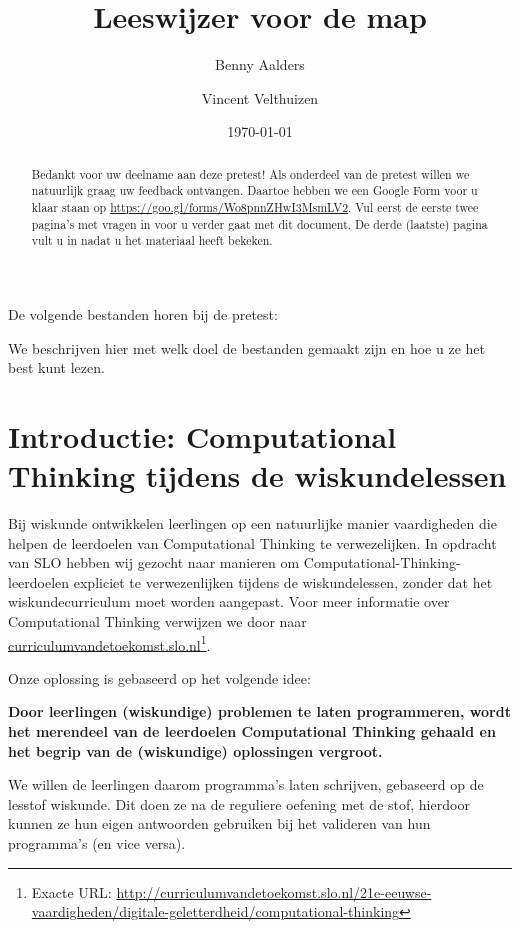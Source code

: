 \documentclass[a4paper]{article}
\author{Benny Aalders \and Vincent Velthuizen}
\date{\today}
\title{Leeswijzer voor de map}
\newcounter{doen}
\begin{document}
\maketitle
\begin{abstract}
\noindent
Bedankt voor uw deelname aan deze pretest! Als onderdeel van de pretest willen we natuurlijk graag uw feedback ontvangen. Daartoe hebben we een Google Form voor u klaar staan op \url{https://goo.gl/forms/Wo8pnnZHwI3MsmLV2}. Vul eerst de eerste twee pagina's met vragen in voor u verder gaat met dit document. De derde (laatste) pagina vult u in nadat u het materiaal heeft bekeken.
\end{abstract}
\renewcommand{\refname}{\vspace{-2em}}
\noindent De volgende bestanden horen bij de pretest:
 
  
We beschrijven hier met welk doel de bestanden gemaakt zijn en hoe u ze het best kunt lezen.

\section{Introductie: Computational Thinking tijdens de wiskundelessen}
Bij wiskunde ontwikkelen leerlingen op een natuurlijke manier vaardigheden die helpen de leerdoelen van Computational Thinking te verwezelijken. In opdracht van SLO hebben wij gezocht naar manieren om Computational-Thinking-leerdoelen expliciet te verwezenlijken tijdens de wiskundelessen, zonder dat het wiskundecurriculum  moet worden aangepast. Voor meer informatie over Computational Thinking verwijzen we door naar \href{http://curriculumvandetoekomst.slo.nl/21e-eeuwse-vaardigheden/digitale-geletterdheid/computational-thinking}{curriculumvandetoekomst.slo.nl}\footnote{Exacte URL: \url{http://curriculumvandetoekomst.slo.nl/21e-eeuwse-vaardigheden/digitale-geletterdheid/computational-thinking}}.

Onze oplossing is gebaseerd  op het volgende idee:
\begin{center}\bfseries\noindent Door leerlingen (wiskundige) problemen te laten programmeren, wordt het merendeel van de leerdoelen Computational Thinking gehaald en het begrip van de (wiskundige) oplossingen vergroot.
\end{center}
We willen de leerlingen daarom programma's laten schrijven, gebaseerd op de lesstof wiskunde. Dit doen ze na de reguliere oefening met de stof, hierdoor kunnen ze hun eigen antwoorden gebruiken bij het valideren van hun programma's (en vice versa).
\end{document}
